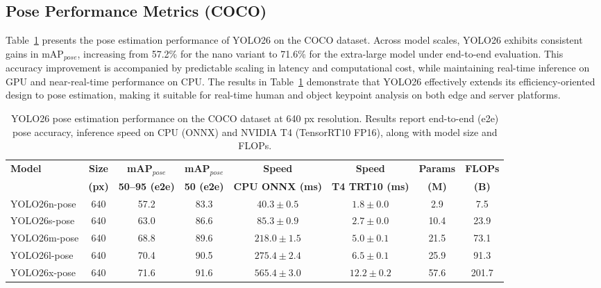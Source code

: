 \documentclass{article}
\begin{document}
\subsection{Pose Performance Metrics (COCO)}
Table~\ref{tab:yolo26_pose} presents the pose estimation performance of YOLO26 on the COCO dataset. Across model scales, YOLO26 exhibits consistent gains in mAP$_{pose}$, increasing from 57.2\% for the nano variant to 71.6\% for the extra-large model under end-to-end evaluation. This accuracy improvement is accompanied by predictable scaling in latency and computational cost, while maintaining real-time inference on GPU and near-real-time performance on CPU. The results in Table~\ref{tab:yolo26_pose} demonstrate that YOLO26 effectively extends its efficiency-oriented design to pose estimation, making it suitable for real-time human and object keypoint analysis on both edge and server platforms.

\begin{table}[h!]
\centering
\scriptsize
\setlength{\tabcolsep}{4pt}
\renewcommand{\arraystretch}{1.15}
\caption{YOLO26 pose estimation performance on the COCO dataset at 640 px resolution. Results report end-to-end (e2e) pose accuracy, inference speed on CPU (ONNX) and NVIDIA T4 (TensorRT10 FP16), along with model size and FLOPs.}
\label{tab:yolo26_pose}
\vspace{2pt}

\begin{tabular}{l c c c c c c c}
\toprule
\textbf{Model} & \textbf{Size} & \textbf{mAP$_{pose}$} & \textbf{mAP$_{pose}$} & \textbf{Speed} & \textbf{Speed} & \textbf{Params} & \textbf{FLOPs} \\
 & \textbf{(px)} & \textbf{50--95 (e2e)} & \textbf{50 (e2e)} & \textbf{CPU ONNX (ms)} & \textbf{T4 TRT10 (ms)} & \textbf{(M)} & \textbf{(B)} \\
\midrule
YOLO26n-pose & 640 & 57.2 & 83.3 & $40.3 \pm 0.5$ & $1.8 \pm 0.0$ & 2.9 & 7.5 \\
YOLO26s-pose & 640 & 63.0 & 86.6 & $85.3 \pm 0.9$ & $2.7 \pm 0.0$ & 10.4 & 23.9 \\
YOLO26m-pose & 640 & 68.8 & 89.6 & $218.0 \pm 1.5$ & $5.0 \pm 0.1$ & 21.5 & 73.1 \\
YOLO26l-pose & 640 & 70.4 & 90.5 & $275.4 \pm 2.4$ & $6.5 \pm 0.1$ & 25.9 & 91.3 \\
YOLO26x-pose & 640 & 71.6 & 91.6 & $565.4 \pm 3.0$ & $12.2 \pm 0.2$ & 57.6 & 201.7 \\
\bottomrule
\end{tabular}
\end{table}
\end{document}
